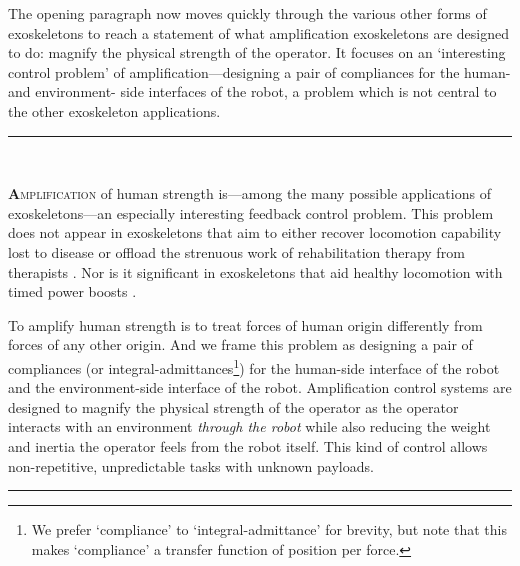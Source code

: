 \documentclass[10pt,letterpaper]{letter}
\newcommand*{\ta}[1]{\textcolor[HTML]{107f10}{#1}}
\newcommand*{\ra}[1]{}
\newcommand*{\IEEEPARstart}[2]{\textsc{\textbf{#1}#2}}
\newcommand{\paperquote}[1]{%
	\begin{center}
		
		\begin{minipage}{.8\textwidth}
			{\rule{\textwidth}{.5pt}}\vspace{.5em}\\
			\begin{minipage}{\textwidth}\setlength{\parindent}{2em}#1\end{minipage}
			\vspace{.5em}
			{\rule{\textwidth}{.5pt}}
		\end{minipage}%
	\end{center}
}
\begin{document}
\begin{letter}{}
The opening paragraph now moves quickly through the various other forms of exoskeletons to reach a statement of what amplification exoskeletons are designed to do: magnify the physical strength of the operator. It focuses on an `interesting control problem' of  amplification---designing a pair of compliances for the human- and environment- side interfaces of the robot, a problem which is not central to the other exoskeleton applications.
\paperquote{
\IEEEPARstart{\ta A}{\ta{mplification}} \ta{of human strength is---among the many possible applications of exoskeletons---an especially interesting feedback control problem.}\ra{
	\IEEEPARstart{E}{xoskeletons} are a broad category of wearable robot\ra{ic}s with many potential applications.}
\ra{Some}\ta{This problem does not appear in exoskeletons that aim to either recover locomotion capability lost to disease \cite{KwaNoordenMisselCraigPrattNeuhaus2009ICRA,HaribHereidAgrawalGurrietFinetBoerisDuburocqMungaiMasselinAmesSreenathGrizzle2018CSM} or offload the strenuous work of rehabilitation therapy from therapists \cite{SugarHeEA2007TNSRE,KimDeshpande2017IJRR}.}
\ta{Nor is it significant in exoskeletons that aid healthy locomotion with timed power boosts \cite{MooneyRouseHerr2014JNRE,ZhangFiersWitteJacksonPoggenseeAtkesonCollins2017Science,LeeKimBakerLongKaravasMenardGalianaWalshJNR2018}.}
\ra{Exosuits (exoskeletons without rigid structures) have also seen some notable success in this area \cite{LeeKimBakerLongKaravasMenardGalianaWalshJNR2018}.}
\ra{This paper focuses on amplification control systems designed to magnify the physical strength of operators as they attempt non-repetitive, unpredictable tasks.}\ta{To amplify human strength is to treat forces of human origin differently from forces of any other origin.}
\ta{And we frame this problem as designing a pair of compliances (or integral-admittances\footnote{\ta{We prefer `compliance' to `integral-admittance' for brevity, but note that this makes `compliance' a transfer function of position per force.}}) for the human-side interface of the robot and the environment-side interface of the robot.
	Amplification control systems are designed to magnify the physical strength of the operator as the operator interacts with an environment \emph{through the robot} while also reducing the weight and inertia the operator feels from the robot itself. This kind of control allows non-repetitive, unpredictable tasks with unknown payloads.
}}


\end{letter}
\end{document}
